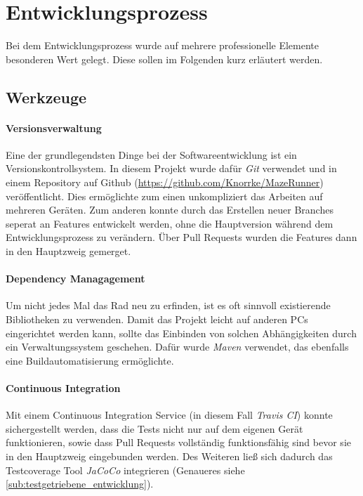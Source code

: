 \section{Entwicklungsprozess} %
\label{sec:entwicklungsprozess}

Bei dem Entwicklungsprozess wurde auf mehrere professionelle Elemente besonderen Wert gelegt. Diese sollen im Folgenden kurz erläutert werden.
\subsection{Werkzeuge} %
\label{sub:werkzeuge}
\paragraph{Versionsverwaltung} %
\label{par:versionsverwaltung}
Eine der grundlegendsten Dinge bei der Softwareentwicklung ist ein Versionskontrollsystem. In diesem Projekt wurde dafür \emph{Git} verwendet und in einem Repository auf Github (\url{https://github.com/Knorrke/MazeRunner}) veröffentlicht. Dies ermöglichte zum einen unkompliziert das Arbeiten auf mehreren Geräten. Zum anderen konnte durch das Erstellen neuer Branches seperat an Features entwickelt werden, ohne die Hauptversion während dem Entwicklungsprozess zu verändern. Über Pull Requests wurden die Features dann in den Hauptzweig gemerget.

\paragraph{Dependency Managagement} %
\label{par:dependency_managagement}
Um nicht jedes Mal das Rad neu zu erfinden, ist es oft sinnvoll existierende Bibliotheken zu verwenden. Damit das Projekt leicht auf anderen PCs eingerichtet werden kann, sollte das Einbinden von solchen Abhängigkeiten durch ein Verwaltungssystem geschehen. Dafür wurde \emph{Maven} verwendet, das ebenfalls eine Buildautomatisierung ermöglichte.

\paragraph{Continuous Integration} %
\label{par:continuous_integration}
Mit einem Continuous Integration Service (in diesem Fall \emph{Travis CI}) konnte sichergestellt werden, dass die Tests nicht nur auf dem eigenen Gerät funktionieren, sowie dass Pull Requests vollständig funktionsfähig sind bevor sie in den Hauptzweig eingebunden werden. Des Weiteren ließ sich dadurch das Testcoverage Tool \emph{JaCoCo} integrieren (Genaueres siehe \ref{sub:testgetriebene_entwicklung}).

